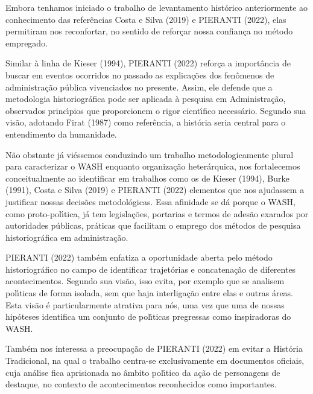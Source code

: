 \documentclass[
12pt,		%
openright,	%
twoside,  %
a4paper,			%
chapter=TITLE,		%
english,			%
french,				%
spanish,			%
brazil				%
]{USPSC-classe/USPSC}
\begin{document}
Embora tenhamos iniciado o trabalho de levantamento hist\'orico anteriormente ao conhecimento das refer\^encias  Costa e Silva (2019) e  PIERANTI (2022), elas permitiram nos reconfortar, no sentido de refor\c{c}ar nossa confian\c{c}a no m\'etodo empregado.




Similar \`a linha de  Kieser (1994),  PIERANTI (2022) refor\c{c}a a import\^ancia de buscar em eventos ocorridos no passado as explica\c{c}\~oes dos fen\^omenos de administra\c{c}\~ao p\'ublica vivenciados no presente. Assim, ele defende que \textquotedbl a metodologia historiogr\'afica pode ser aplicada \`a pesquisa em Administra\c{c}\~ao\textquotedbl , observados princ\'{\i}pios que proporcionem o rigor cient\'{\i}fico necess\'ario. Segundo sua vis\~ao, adotando  Firat (1987) como refer\^encia, a hist\'oria seria \textquotedbl central para o entendimento da humanidade\textquotedbl .




N\~ao obstante j\'a vi\'essemos conduzindo um trabalho metodologicamente plural para caracterizar o WASH enquanto organiza\c{c}\~ao heter\'arquica, nos fortalecemos conceitualmente ao identificar em trabalhos como os de  Kieser (1994),  Burke (1991), Costa e Silva (2019) e PIERANTI (2022) elementos que nos ajudassem a justificar nossas decis\~oes metodol\'ogicas. Essa afinidade se d\'a porque o WASH, como proto-pol\'{\i}tica, j\'a tem legisla\c{c}\~oes, portarias e termos de ades\~ao exarados por autoridades p\'ublicas, pr\'aticas que facilitam o emprego dos m\'etodos de pesquisa historiogr\'afica em administra\c{c}\~ao.




 PIERANTI (2022) tamb\'em enfatiza a oportunidade aberta pelo m\'etodo historiogr\'afico  no campo de identificar trajet\'orias e concatena\c{c}\~ao de diferentes acontecimentos. Segundo sua vis\~ao, \textquotedbl isso evita, por exemplo que se analisem pol\'{\i}ticas de forma isolada, sem que haja interliga\c{c}\~ao entre elas e outras \'areas\textquotedbl . Esta vis\~ao \'e particularmente atrativa para n\'os, uma vez que uma de nossas hip\'oteses identifica um conjunto de pol\'{\i}ticas pregressas como inspiradoras do WASH.




Tamb\'em nos interessa a preocupa\c{c}\~ao de  PIERANTI (2022) em evitar a Hist\'oria Tradicional, na qual o trabalho centra-se exclusivamente em documentos oficiais, cuja an\'alise fica aprisionada no \^ambito pol\'{\i}tico da a\c{c}\~ao de \textquotedbl personagens de destaque\textquotedbl , no contexto de \textquotedbl acontecimentos reconhecidos como importantes\textquotedbl .
\end{document}
